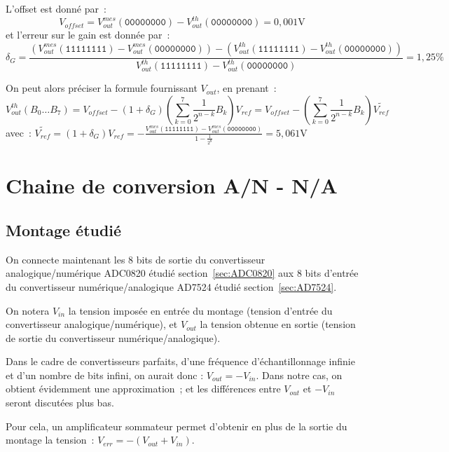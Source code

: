 \documentclass{article}
\begin{document}
L'offset est donné par~: 
\begin{equation*}
V_{offset}=V_{out}^{mes}(\mathtt{00000000})-V_{out}^{th}(\mathtt{00000000})=0,001\mathrm{V}
\end{equation*}
et l'erreur sur le gain est donnée par~:
\begin{equation*}
\delta_G=\frac{(V_{out}^{mes}(\mathtt{11111111})-V_{out}^{mes}(\mathtt{00000000}))-(V_{out}^{th}(\mathtt{11111111})-V_{out}^{th}(\mathtt{00000000}))}{V_{out}^{th}(\mathtt{11111111})-V_{out}^{th}(\mathtt{00000000})}=1,25\mathrm{\%}
\end{equation*}

On peut alors préciser la formule fournissant $V_{out}$, en prenant~:
\begin{equation*}
V_{out}^{th}(B_0\dots B_7) = V_{offset}-(1+\delta_G)\left(\sum_{k=0}^{7}\frac{1}{2^{n-k}}B_k\right)V_{ref} = V_{offset}-\left(\sum_{k=0}^{7}\frac{1}{2^{n-k}}B_k\right)\widetilde{V_{ref}}
\end{equation*}
avec~: $\widetilde{V_{ref}} = (1+\delta_G)V_{ref} = -\frac{V_{out}^{mes}(\mathtt{11111111})-V_{out}^{mes}(\mathtt{00000000})}{1-\frac{1}{2^8}} = 5,061\mathrm{V}$



\section{Chaine de conversion A/N - N/A}


\subsection{Montage étudié}

On connecte maintenant les 8 bits de sortie du convertisseur analogique/numérique ADC0820 étudié section~\ref{sec:ADC0820} aux 8 bits d'entrée du convertisseur numérique/analogique AD7524 étudié section~\ref{sec:AD7524}.

On notera $V_{in}$ la tension imposée en entrée du montage (tension d'entrée du convertisseur analogique/numérique), et $V_{out}$ la tension obtenue en sortie (tension de sortie du convertisseur numérique/analogique). 

Dans le cadre de convertisseurs parfaits, d'une fréquence d'échantillonnage infinie et d'un nombre de bits infini, on aurait donc : $V_{out}=-V_{in}$. Dans notre cas, on obtient évidemment une approximation~; et les différences entre $V_{out}$ et $-V_{in}$ seront discutées plus bas.

Pour cela, un amplificateur sommateur permet d'obtenir en plus de la sortie du montage la tension~: ${V_{err}=-(V_{out}+V_{in})}$.
\end{document}
